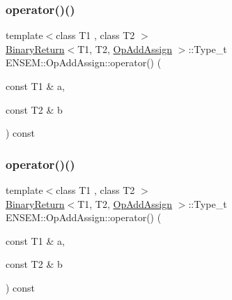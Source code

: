 \subsubsection{\texorpdfstring{operator()()}{operator()()}\hspace{0.1cm}{\footnotesize\ttfamily [1/3]}}
{\footnotesize\ttfamily template$<$class T1 , class T2 $>$ \\
\mbox{\hyperlink{structENSEM_1_1BinaryReturn}{Binary\+Return}}$<$T1, T2, \mbox{\hyperlink{structENSEM_1_1OpAddAssign}{Op\+Add\+Assign}} $>$\+::Type\+\_\+t E\+N\+S\+E\+M\+::\+Op\+Add\+Assign\+::operator() (\begin{DoxyParamCaption}\item[{const T1 \&}]{a,  }\item[{const T2 \&}]{b }\end{DoxyParamCaption}) const\hspace{0.3cm}{\ttfamily [inline]}}

\mbox{\label{structENSEM_1_1OpAddAssign_a115e2f2eb7eaf306b7af0ad00e7801b8}} 
\subsubsection{\texorpdfstring{operator()()}{operator()()}\hspace{0.1cm}{\footnotesize\ttfamily [2/3]}}
{\footnotesize\ttfamily template$<$class T1 , class T2 $>$ \\
\mbox{\hyperlink{structENSEM_1_1BinaryReturn}{Binary\+Return}}$<$T1, T2, \mbox{\hyperlink{structENSEM_1_1OpAddAssign}{Op\+Add\+Assign}} $>$\+::Type\+\_\+t E\+N\+S\+E\+M\+::\+Op\+Add\+Assign\+::operator() (\begin{DoxyParamCaption}\item[{const T1 \&}]{a,  }\item[{const T2 \&}]{b }\end{DoxyParamCaption}) const\hspace{0.3cm}{\ttfamily [inline]}}

\mbox{\label{structENSEM_1_1OpAddAssign_a115e2f2eb7eaf306b7af0ad00e7801b8}} 
